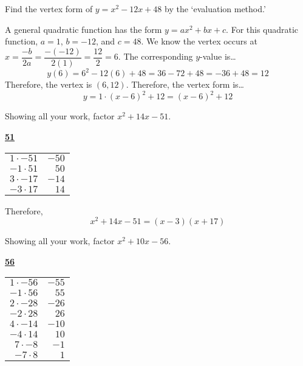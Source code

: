 \documentclass[11pt,letterpaper]{article}
\begin{document}
\newpage



 Find the vertex form of $y= x^2 - 12x + 48$ by the `evaluation method.' \pspace 

\sol A general quadratic function has the form $y= ax^2 + bx + c$. For this quadratic function, $a= 1$, $b= -12$, and $c= 48$. We know the vertex occurs at $x= \dfrac{-b}{2a}= \dfrac{-(-12)}{2(1)}= \dfrac{12}{2}= 6$. The corresponding $y$-value is\dots
	\[
	y(6)= 6^2 - 12(6) + 48= 36 - 72 + 48= -36 + 48= 12
	\]
Therefore, the vertex is $(6, 12)$. Therefore, the vertex form is\dots
	\[
	y= 1 \cdot (x - 6)^2 + 12= (x - 6)^2 + 12
	\]



\newpage



 Showing all your work, factor $x^2 + 14x - 51$. \pspace

\sol 
	\begin{table}[!ht]
	\centering
	\underline{\bfseries 51} \pvspace{0.2cm}
	\begin{tabular}{rr}
	$1 \cdot -51$ & $-50$ \\
	$-1 \cdot 51$ & $50$ \\
	$3 \cdot -17$ & $-14$ \\ \hline
	\multicolumn{1}{|r}{$-3 \cdot 17$} & \multicolumn{1}{r|}{$14$} \\ \hline
	\end{tabular}
	\end{table}

Therefore,
	\[
	x^2 + 14x - 51= (x - 3)(x + 17)
	\]



\newpage



 Showing all your work, factor $x^2 + 10x - 56$. \pspace

\sol 
	\begin{table}[!ht]
	\centering
	\underline{\bfseries 56} \pvspace{0.2cm}
	\begin{tabular}{rr}
	$1 \cdot -56$ & $-55$ \\
	$-1 \cdot 56$ & $55$ \\
	$2 \cdot -28$ & $-26$ \\
	$-2 \cdot 28$ & $26$ \\
	$4 \cdot -14$ & $-10$ \\ \hline
	\multicolumn{1}{|r}{$-4 \cdot 14$} & \multicolumn{1}{r|}{$10$} \\ \hline
	$7 \cdot -8$ & $-1$ \\
	$-7 \cdot 8$ & $1$ 
	\end{tabular}
	\end{table}
\end{document}
